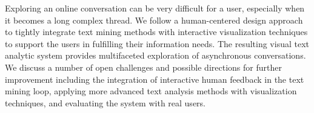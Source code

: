 Exploring an online conversation can be very difficult for a user, especially when it becomes a long complex thread. We follow a human-centered design approach to  tightly integrate text mining methods with interactive visualization techniques to support the users in fulfilling their information needs. The resulting visual text analytic system provides multifaceted exploration of asynchronous conversations. We discuss a number of open challenges and possible directions for further improvement including the integration of interactive human feedback in the text mining loop, applying more advanced text analysis methods with visualization techniques, and evaluating the system with real users.
